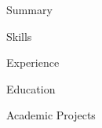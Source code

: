 \documentclass{resume} %
\begin{document}

\begin{rSection}{Summary}
\end{rSection}



\begin{rSection}{Skills}

\end{rSection}


\begin{rSection}{Experience}

\end{rSection}


\begin{rSection}{Education}

\end{rSection}

\pagebreak


\begin{rSection}{Academic Projects}

\end{rSection}

\end{document}
